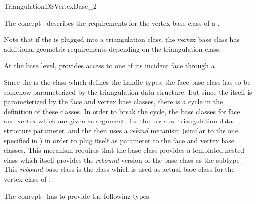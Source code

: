 

\begin{ccRefConcept}{TriangulationDSVertexBase_2}


\ccDefinition
  
The concept \ccRefName\ describes the requirements for the
vertex base class of a .

Note that if  the  
is plugged  into a triangulation class, 
the vertex base class has additional geometric
requirements depending on the triangulation class.

At the base level,  
provides access to one of its incident
face through a .

Since the  is the class 
which defines the handle
types, the face base class has to be somehow 
parameterized by the triangulation
data structure.  But since the 
itself is parameterized by the face and vertex
base classes, there is a cycle in the definition of these classes.  
In order
to break the cycle, the base classes for face and vertex  which are given as
arguments for the  
use a  as triangulation
data structure parameter, and the
 then uses a {\it rebind}  mecanism (similar to the one specified in
) in order to plug itself 
as parameter to the face and vertex  base classes. 
This mecanism requires that the base class  provides
a templated nested class  which
itself provides the {\it rebound} version of the base class
as the subtype .
 This {\it rebound} base class is  the class
which is used as actual base class for the vertex class
of .


\ccTypes
{}
\ccThreeToTwo
The concept \ccRefName\ has to provide the following types.


\end{ccRefConcept}
